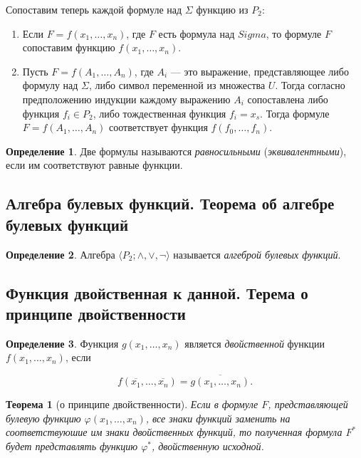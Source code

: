 \documentclass{article}
\newtheorem*{theorem*}{Теорема}
\theoremstyle{plain}
\theoremstyle{definition}
\newtheorem{definition}{Определение}[subsection]
\begin{document}
Сопоставим теперь каждой формуле над \(\Sigma\) функцию из \(P_2\):

\begin{enumerate}
	\item Если \(F = f(x_1, \ldots, x_n)\), где \(F\) есть формула над \(Sigma\), то формуле \(F\) сопоставим функцию \(f(x_1, \ldots, x_n)\).
	\item Пусть \(F = f(A_1, \ldots, A_n)\), где \(A_i\) --- это выражение, представляющее либо формулу над \(\Sigma\), либо символ переменной из множества \(U\). Тогда согласно предположению индукции каждому выражению \(A_i\) сопоставлена либо функция \(f_i \in P_2\), либо тождественная функция \(f_i = x_s\). Тогда формуле \(F = f(A_1, \ldots, A_n)\) соответствует функция \(f(f_0, \ldots, f_n)\).
\end{enumerate}

\begin{definition}
	Две формулы называются \textit{равносильными} (\textit{эквивалентными}), если им соответствуют равные функции.
\end{definition}

\subsection{Алгебра булевых функций. Теорема об алгебре булевых функций}

\begin{definition}
	Алгебра \(\langle P_2; \land, \lor, \lnot \rangle\) называется \textit{алгеброй булевых функций}.
\end{definition}

\subsection{Функция двойственная к данной. Терема о принципе двойственности}

\begin{definition}
	Функция \(g(x_1, \ldots, x_n)\) является \textit{двойственной} функции \(f(x_1, \ldots, x_n)\), если

	\[
		f(\overline{x_1}, \ldots, \overline{x_n}) = \overline{g(x_1, \ldots, x_n)}.
	\]
\end{definition}

\begin{theorem*}[о принципе двойственности]
	Если в формуле \(F\), представляющей булевую функцию \(\varphi(x_1, \ldots, x_n)\), все знаки функций заменить на соответствуюшие им знаки двойственных функций, то полученная формула \(F^*\) будет представлять функцию \(\varphi^*\), двойственную исходной.
\end{theorem*}
\end{document}

